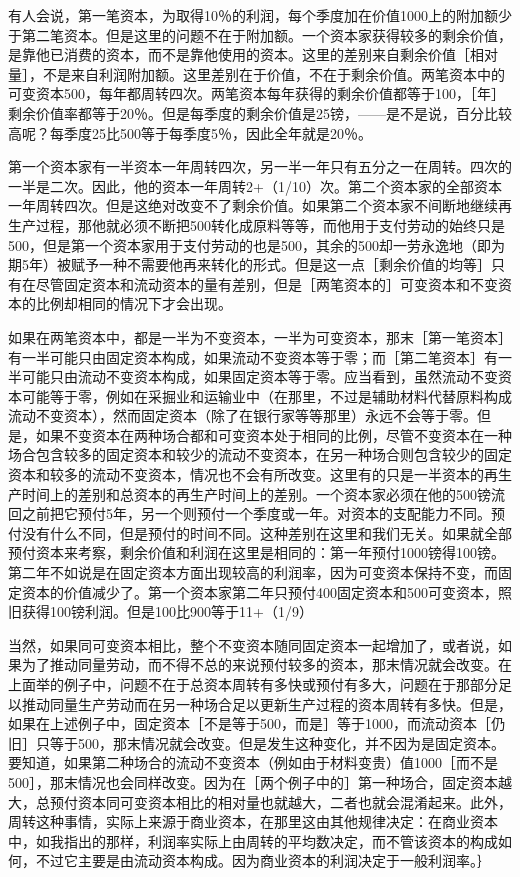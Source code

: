 有人会说，第一笔资本，为取得10％的利润，每个季度加在价值1000上的附加额少于第二笔资本。但是这里的问题不在于附加额。一个资本家获得较多的剩余价值，是靠他已消费的资本，而不是靠他使用的资本。这里的差别来自剩余价值［相对量］，不是来自利润附加额。这里差别在于价值，不在于剩余价值。两笔资本中的可变资本500，每年都周转四次。两笔资本每年获得的剩余价值都等于100，［年］剩余价值率都等于20％。但是每季度的剩余价值是25镑，——是不是说，百分比较高呢？每季度25比500等于每季度5％，因此全年就是20％。

第一个资本家有一半资本一年周转四次，另一半一年只有五分之一在周转。四次的一半是二次。因此，他的资本一年周转2+（1/10）次。第二个资本家的全部资本一年周转四次。但是这绝对改变不了剩余价值。如果第二个资本家不间断地继续再生产过程，那他就必须不断把500转化成原料等等，而他用于支付劳动的始终只是500，但是第一个资本家用于支付劳动的也是500，其余的500却一劳永逸地（即为期5年）被赋予一种不需要他再来转化的形式。但是这一点［剩余价值的均等］只有在尽管固定资本和流动资本的量有差别，但是［两笔资本的］可变资本和不变资本的比例却相同的情况下才会出现。

如果在两笔资本中，都是一半为不变资本，一半为可变资本，那末［第一笔资本］有一半可能只由固定资本构成，如果流动不变资本等于零；而［第二笔资本］有一半可能只由流动不变资本构成，如果固定资本等于零。应当看到，虽然流动不变资本可能等于零，例如在采掘业和运输业中（在那里，不过是辅助材料代替原料构成流动不变资本），然而固定资本（除了在银行家等等那里）永远不会等于零。但是，如果不变资本在两种场合都和可变资本处于相同的比例，尽管不变资本在一种场合包含较多的固定资本和较少的流动不变资本，在另一种场合则包含较少的固定资本和较多的流动不变资本，情况也不会有所改变。这里有的只是一半资本的再生产时间上的差别和总资本的再生产时间上的差别。一个资本家必须在他的500镑流回之前把它预付5年，另一个则预付一个季度或一年。对资本的支配能力不同。预付没有什么不同，但是预付的时间不同。这种差别在这里和我们无关。如果就全部预付资本来考察，剩余价值和利润在这里是相同的：第一年预付1000镑得100镑。第二年不如说是在固定资本方面出现较高的利润率，因为可变资本保持不变，而固定资本的价值减少了。第一个资本家第二年只预付400固定资本和500可变资本，照旧获得100镑利润。但是100比900等于11+（1/9）%

当然，如果同可变资本相比，整个不变资本随同固定资本一起增加了，或者说，如果为了推动同量劳动，而不得不总的来说预付较多的资本，那末情况就会改变。在上面举的例子中，问题不在于总资本周转有多快或预付有多大，问题在于那部分足以推动同量生产劳动而在另一种场合足以更新生产过程的资本周转有多快。但是，如果在上述例子中，固定资本［不是等于500，而是］等于1000，而流动资本［仍旧］只等于500，那末情况就会改变。但是发生这种变化，并不因为是固定资本。要知道，如果第二种场合的流动不变资本（例如由于材料变贵）值1000［而不是500］，那末情况也会同样改变。因为在［两个例子中的］第一种场合，固定资本越大，总预付资本同可变资本相比的相对量也就越大，二者也就会混淆起来。此外，周转这种事情，实际上来源于商业资本，在那里这由其他规律决定：在商业资本中，如我指出的那样，利润率实际上由周转的平均数决定，而不管该资本的构成如何，不过它主要是由流动资本构成。因为商业资本的利润决定于一般利润率。｝

